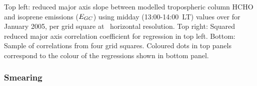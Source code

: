     { %
      Top left: reduced major axis slope between modelled tropospheric column HCHO and isoprene emissions ($E_{GC}$) using midday (13:00-14:00~LT) values over for January 2005, per grid square at \lowhr ~horizontal resolution.
      Top right: Squared reduced major axis correlation coefficient for regression in top left. 
      Bottom: Sample of correlations from four grid squares.
      Coloured dots in top panels correspond to the colour of the regressions shown in bottom panel.
    }
    {\label{BioIsop:method:slope:fig_regressions}}
    
    
    \subsubsection{Smearing}
      \label{BioIsop:method:smearing}

